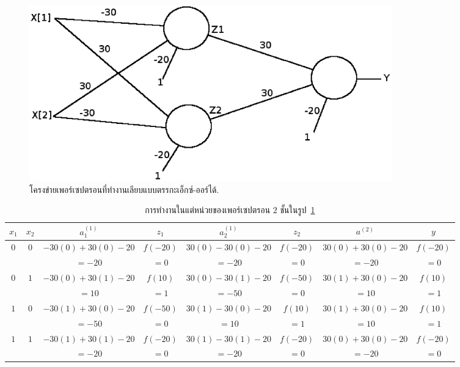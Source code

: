 %
\begin{figure}
\begin{center}
\includegraphics[height=3in]{04ANN/MLPXor.eps}
\end{center}
\caption{โครงข่ายเพอร์เซปตรอนที่ทำงานเลียบแบบตรรกะเอ็กซ์-ออร์ได้.}
\label{fig: ANN MLP for XOR}
\end{figure}
%

%
\begin{table}[hbtp]
\caption{การทำงานในแต่หน่วยของเพอร์เซปตรอน $2$ ชั้นในรูป~\ref{fig: ANN MLP for XOR}}
{\tiny %
\begin{center}
\begin{tabular}{|c|c|c|c|c|c|c|c|}
\hline 
$x_1$ & $x_2$ 
 & $a^{(1)}_1$ & $z_1$ 
 & $a^{(1)}_2$ & $z_2$ 
 & $a^{(2)}$ & $y$ \\
\hline
$0$     &    $0$  
& $-30 (0) + 30 (0) - 20$   & $f(-20)$
& $30 (0) - 30 (0) - 20$   & $f(-20)$
& $30 (0) + 30 (0) - 20$  & $f(-20)$ \\
& 
& $= -20$ & $= 0$
& $= -20$ & $= 0$
& $= -20$ &  $= 0$ \\
\hline
$0$     &    $1$  
& $-30 (0) + 30 (1) - 20$   & $f(10)$
& $30 (0) - 30 (1) - 20$   & $f(-50)$
& $30 (1) + 30 (0) - 20$  & $f(10)$ \\
& 
& $= 10$ & $= 1$
& $= -50$ & $= 0$
& $= 10$ &  $= 1$ \\
\hline
$1$     &    $0$  
& $-30 (1) + 30 (0) - 20$   & $f(-50)$
& $30 (1) - 30 (0) - 20$   & $f(10)$
& $30 (1) + 30 (0) - 20$  & $f(10)$ \\
& 
& $= -50$ & $= 0$
& $= 10$ & $= 1$
& $= 10$ &  $= 1$ \\
\hline
$1$     &    $1$  
& $-30 (1) + 30 (1) - 20$   & $f(-20)$
& $30 (1) - 30 (1) - 20$   & $f(-20)$
& $30 (0) + 30 (0) - 20$  & $f(-20)$ \\
& 
& $= -20$ & $= 0$
& $= -20$ & $= 0$
& $= -20$ &  $= 0$ \\
\hline
\end{tabular} 
\end{center}
}%
\label{tbl: ANN MLP for XOR}
\end{table}

